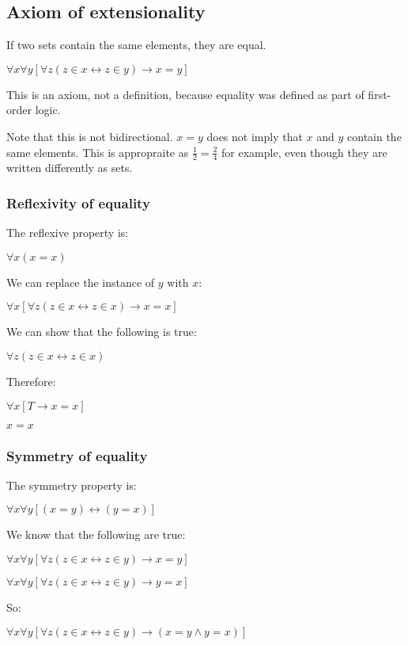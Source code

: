
\subsection{Axiom of extensionality}

If two sets contain the same elements, they are equal.

$\forall x \forall y[\forall z(z\in x \leftrightarrow z\in y)\rightarrow x=y]$

This is an axiom, not a definition, because equality was defined as part of first-order logic.

Note that this is not bidirectional. \(x=y\) does not imply that \(x\) and \(y\) contain the same elements. This is appropraite as \(\frac{1}{2}= \frac{2}{4}\) for example, even though they are written differently as sets.

\subsubsection{Reflexivity of equality}

The reflexive property is:

$\forall x(x=x)$

We can replace the instance of \(y\)  with \(x\):

$\forall x [\forall z(z\in x \leftrightarrow z\in x)\rightarrow x=x]$

We can show that the following is true:

$\forall z(z\in x \leftrightarrow z\in x)$

Therefore:

$\forall x [T \rightarrow x=x]$

\(x=x\)

\subsubsection{Symmetry of equality}

The symmetry property is:

$\forall x \forall y[(x=y)\leftrightarrow (y=x)]$

We know that the following are true:

$\forall x \forall y[\forall z(z\in x \leftrightarrow z\in y)\rightarrow x=y]$

$\forall x \forall y[\forall z(z\in x \leftrightarrow z\in y)\rightarrow y=x]$

So:

$\forall x \forall y[\forall z(z\in x \leftrightarrow z\in y)\rightarrow (x=y\land y=x)]$

